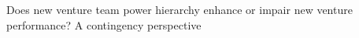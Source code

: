 \documentclass[12pt]{article}
\begin{document}







Does new venture team power hierarchy enhance or impair new venture performance? A contingency perspective



\end{document}
